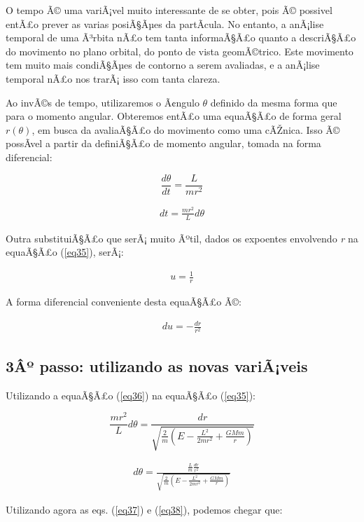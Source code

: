 O tempo Ã© uma variÃ¡vel muito interessante de se obter, pois Ã© possivel entÃ£o prever as varias posiÃ§Ãµes da partÃ­cula. No entanto, a anÃ¡lise temporal de uma Ã³rbita nÃ£o tem tanta informaÃ§Ã£o quanto a descriÃ§Ã£o do movimento no plano orbital, do ponto de vista geomÃ©trico. Este movimento tem muito mais condiÃ§Ãµes de contorno a serem avaliadas, e a anÃ¡lise temporal nÃ£o nos trarÃ¡ isso com tanta clareza. {\\}

Ao invÃ©s de tempo, utilizaremos o Ã¢ngulo $\theta$ definido da mesma forma que para o momento angular. Obteremos entÃ£o uma equaÃ§Ã£o de forma geral $r(\theta)$, em busca da avaliaÃ§Ã£o do movimento como uma cÃŽnica. Isso Ã© possÃ­vel a partir da definiÃ§Ã£o de momento angular, tomada na forma diferencial:

\[
	\frac{d\theta}{dt} = \frac{L}{mr^2}
\]

\begin{eqnarray}
	dt = \frac{mr^2}{L}d\theta \label{eq36}
\end{eqnarray}

Outra substituiÃ§Ã£o que serÃ¡ muito Ãºtil, dados os expoentes envolvendo \textit{r} na equaÃ§Ã£o (\ref{eq35}), serÃ¡:

\begin{eqnarray}
	u = \frac{1}{r} \label{eq37}
\end{eqnarray}

A forma diferencial conveniente desta equaÃ§Ã£o Ã©:

\begin{eqnarray}
	du = -\frac{dr}{r^2} \label{eq38}
\end{eqnarray}

\subsection{3Âº passo: utilizando as novas variÃ¡veis}

Utilizando a equaÃ§Ã£o (\ref{eq36}) na equaÃ§Ã£o (\ref{eq35}):

\[
	\frac{mr^2}{L}d\theta = \frac{dr}{\sqrt{\frac{2}{m}\left(E - \frac{L^2}{2mr^2} + \frac{GMm}{r}\right)}}
\]

\begin{eqnarray}
	d\theta = \frac{\frac{L}{m}\frac{dr}{r^2}}{\sqrt{\frac{2}{m}\left(E - \frac{L^2}{2mr^2} + \frac{GMm}{r}\right)}} \label{eq39}
\end{eqnarray}

Utilizando agora as eqs. (\ref{eq37}) e (\ref{eq38}), podemos chegar que:  


